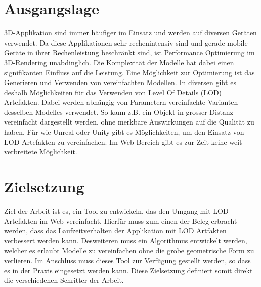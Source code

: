 \section{Ausgangslage}
3D-Applikation sind immer häufiger im Einsatz und werden auf diversen Geräten verwendet. Da diese Applikationen sehr rechenintensiv sind und gerade mobile Geräte in ihrer Rechenleistung beschränkt sind, ist Performance Optimierung im 3D-Rendering unabdinglich. Die Komplexität der Modelle hat dabei einen signifikanten Einfluss auf die Leistung.
Eine Möglichkeit zur Optimierung ist das Generieren und Verwenden von vereinfachten Modellen. In diversen  gibt es deshalb Möglichkeiten für das Verwenden von Level Of Details (LOD) Artefakten. Dabei werden abhängig von Parametern vereinfachte Varianten desselben Modelles verwendet. So kann z.B. ein Objekt in grosser Distanz vereinfacht dargestellt werden, ohne merkbare Auswirkungen auf die Qualität zu haben.
Für  wie Unreal oder Unity gibt es Möglichkeiten, um den Einsatz von LOD Artefakten zu vereinfachen. Im Web Bereich gibt es zur Zeit keine weit verbreitete Möglichkeit.

\section{Zielsetzung}
Ziel der Arbeit ist es, ein Tool zu entwickeln, das den Umgang mit LOD Artefakten im Web vereinfacht. Hierfür muss zum einen der Beleg erbracht werden, dass das Laufzeitverhalten der Applikation mit LOD Artfakten verbessert werden kann. Desweiteren muss ein Algorithmus entwickelt werden, welcher es erlaubt Modelle zu vereinfachen ohne die grobe geometrische Form zu verlieren. Im Anschluss muss dieses Tool zur Verfügung gestellt werden, so dass es in der Praxis eingesetzt werden kann. Diese Zielsetzung definiert somit direkt die verschiedenen Schritter der Arbeit.

